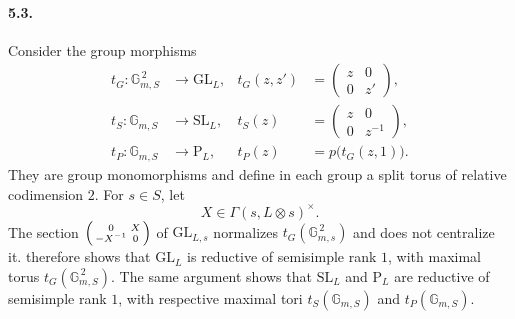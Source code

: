 \paragraph{\textbf{5.3.}}
Consider the group morphisms
\[
\begin{aligned}
 t_G\colon\mathbb G_{m,S}^{\,2}&\longrightarrow\mathrm{GL}_L,
 &t_G(z,z')&=\begin{pmatrix}z&0\\0&z'\end{pmatrix},\\
 t_S\colon\mathbb G_{m,S}&\longrightarrow\mathrm{SL}_L,
 &t_S(z)&=\begin{pmatrix}z&0\\0&z^{-1}\end{pmatrix},\\
 t_P\colon\mathbb G_{m,S}&\longrightarrow\mathrm P_L,
 &t_P(z)&=p\bigl(t_G(z,1)\bigr).
\end{aligned}
\]
They are group monomorphisms and define in each group a split torus of
relative codimension \(2\).  For \(s\in S\), let
\[
 X\in\Gamma(s,L\otimes s)^\times.
\]
The section
\(\begin{psmallmatrix}0&X\\-X^{-1}&0\end{psmallmatrix}\) of
\(\mathrm{GL}_{L,s}\) normalizes \(t_G(\mathbb G_{m,s}^{\,2})\) and
does not centralize it.   therefore shows that
\(\mathrm{GL}_L\) is reductive of semisimple rank \(1\), with maximal
torus \(t_G(\mathbb G_{m,S}^{\,2})\).  The same argument shows that
\(\mathrm{SL}_L\) and \(\mathrm P_L\) are reductive of semisimple rank
\(1\), with respective maximal tori
\(t_S(\mathbb G_{m,S})\) and \(t_P(\mathbb G_{m,S})\).

